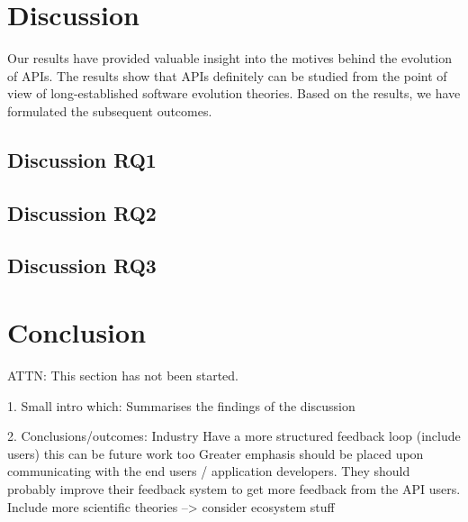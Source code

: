 \documentclass{sig-alternate}
\begin{document}
\section{Discussion} \label{discussion}
Our results have provided valuable insight into the motives behind the evolution of APIs. The results show that APIs definitely can be studied from the point of view of long-established software evolution theories. Based on the results, we have formulated the subsequent outcomes. 

\subsection{Discussion RQ1}  


\subsection{Discussion RQ2}

\subsection{Discussion RQ3}









\section{Conclusion} \label{conclusion}
ATTN: This section has not been started. 

1. Small intro which: Summarises the findings of the discussion

2. Conclusions/outcomes:
Industry
Have a more structured feedback loop (include users) this can be future work too
              Greater emphasis should be placed upon communicating with the end users / application developers. They should probably improve their feedback system to get more feedback from the API users.
              Include more scientific theories
              --> consider ecosystem stuff
\end{document}
